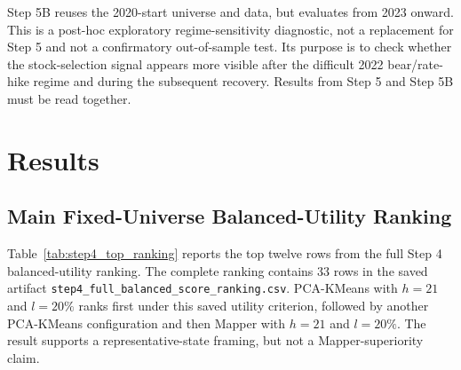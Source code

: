\documentclass[runningheads]{llncs}
\begin{document}
Step 5B reuses the 2020-start universe and data, but evaluates from 2023 onward. This is a post-hoc exploratory regime-sensitivity diagnostic, not a replacement for Step 5 and not a confirmatory out-of-sample test. Its purpose is to check whether the stock-selection signal appears more visible after the difficult 2022 bear/rate-hike regime and during the subsequent recovery. Results from Step 5 and Step 5B must be read together.

\section{Results}

\subsection{Main Fixed-Universe Balanced-Utility Ranking}

Table~\ref{tab:step4_top_ranking} reports the top twelve rows from the full Step 4 balanced-utility ranking. The complete ranking contains 33 rows in the saved artifact \texttt{step4\_full\_balanced\_score\_ranking.csv}. PCA-KMeans with $h=21$ and $l=20\%$ ranks first under this saved utility criterion, followed by another PCA-KMeans configuration and then Mapper with $h=21$ and $l=20\%$. The result supports a representative-state framing, but not a Mapper-superiority claim.
\end{document}

